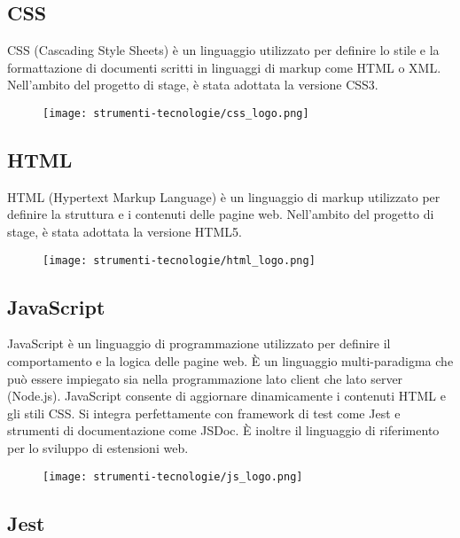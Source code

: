 \subsection*{CSS}

\par CSS (Cascading Style Sheets) è un linguaggio utilizzato per definire lo stile e la formattazione di documenti scritti in linguaggi di markup come HTML o XML. Nell’ambito del progetto di stage, è stata adottata la versione CSS3.

\begin{figure}[H]
    \centering 
    \texttt{[image: strumenti-tecnologie/css\_logo.png]} 
\end{figure}

\subsection*{HTML}

\par HTML (Hypertext Markup Language) è un linguaggio di markup utilizzato per definire la struttura e i contenuti delle pagine web. Nell’ambito del progetto di stage, è stata adottata la versione HTML5.

\begin{figure}[H]
    \centering 
    \texttt{[image: strumenti-tecnologie/html\_logo.png]} 
\end{figure}

\subsection*{JavaScript}

\par JavaScript è un linguaggio di programmazione utilizzato per definire il comportamento e la logica delle pagine web. È un linguaggio multi-paradigma che può essere impiegato sia nella programmazione lato client che lato server (Node.js). JavaScript consente di aggiornare dinamicamente i contenuti HTML e gli stili CSS. Si integra perfettamente con framework di test come Jest e strumenti di documentazione come JSDoc. È inoltre il linguaggio di riferimento per lo sviluppo di estensioni web.

\begin{figure}[H]
    \centering 
    \texttt{[image: strumenti-tecnologie/js\_logo.png]} 
\end{figure}

\subsection*{Jest}

